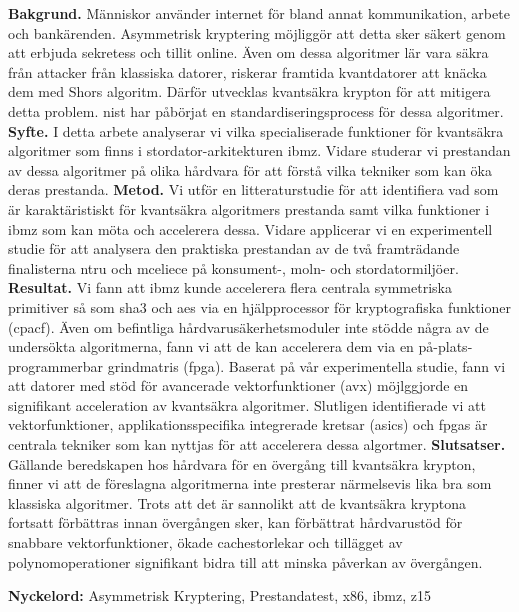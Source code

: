 \sammanfattning
\noindent
\textbf{Bakgrund.} Människor använder internet för bland annat kommunikation, arbete och bankärenden. Asymmetrisk kryptering möjliggör att detta sker säkert genom att erbjuda sekretess och tillit online. Även om dessa algoritmer lär vara säkra från attacker från klassiska datorer, riskerar framtida kvantdatorer att knäcka dem med Shors algoritm. Därför utvecklas kvantsäkra krypton för att mitigera detta problem. \acrfull{nist} har påbörjat en standardiseringsprocess för dessa algoritmer.\newline
\textbf{Syfte.} I detta arbete analyserar vi vilka specialiserade funktioner för kvantsäkra algoritmer som finns i stordator-arkitekturen \gls{ibmz}. Vidare studerar vi prestandan av dessa algoritmer på olika hårdvara för att förstå vilka tekniker som kan öka deras prestanda.\newline
\textbf{Metod.} Vi utför en litteraturstudie för att identifiera vad som är karaktäristiskt för kvantsäkra algoritmers prestanda samt vilka funktioner i \gls{ibmz} som kan möta och accelerera dessa. Vidare applicerar vi en experimentell studie för att analysera den praktiska prestandan av de två framträdande finalisterna \gls{ntru} och \gls{mceliece} på konsument-, moln- och stordatormiljöer.\newline
\textbf{Resultat.} Vi fann att \gls{ibmz} kunde accelerera flera centrala symmetriska primitiver så som \gls{sha3} och \gls{aes} via en hjälpprocessor för kryptografiska funktioner (\acrshort{cpacf}). Även om befintliga hårdvarusäkerhetsmoduler inte stödde några av de undersökta algoritmerna, fann vi att de kan accelerera dem via en på-plats-programmerbar grindmatris (\acrshort{fpga}). Baserat på vår experimentella studie, fann vi att datorer med stöd för avancerade vektorfunktioner (\gls{avx}) möjlggjorde en signifikant acceleration av kvantsäkra algoritmer. Slutligen identifierade vi att vektorfunktioner, applikationsspecifika integrerade kretsar (\acrshort{asic}s) och \acrshort{fpga}s är centrala tekniker som kan nyttjas för att accelerera dessa algortmer.\newline
\textbf{Slutsatser.} Gällande beredskapen hos hårdvara för en övergång till kvantsäkra krypton, finner vi att de föreslagna algoritmerna inte presterar närmelsevis lika bra som klassiska algoritmer. Trots att det är sannolikt att de kvantsäkra kryptona fortsatt förbättras innan övergången sker, kan förbättrat hårdvarustöd för snabbare vektorfunktioner, ökade cachestorlekar och tillägget av polynomoperationer signifikant bidra till att minska påverkan av övergången.

\vspace{1cm}
\noindent
\textbf{Nyckelord:} Asymmetrisk Kryptering, Prestandatest, \gls{x86}, \gls{ibmz}, \gls{z15}

\cleardoublepage